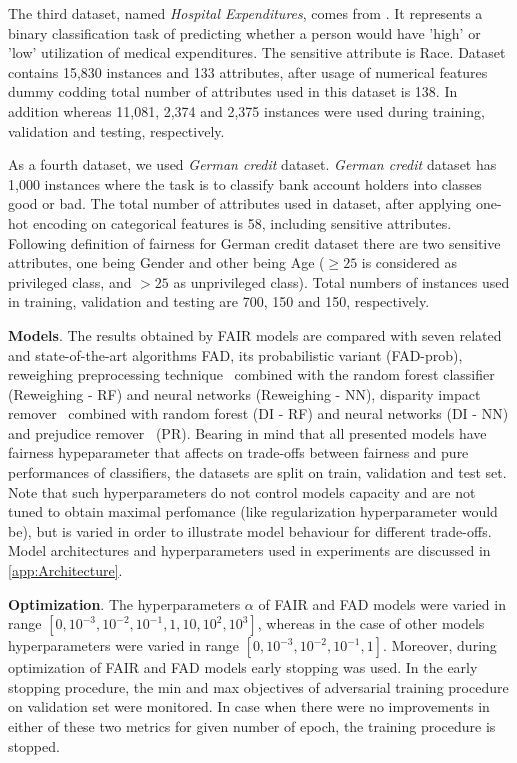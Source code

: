 \documentclass[preprint,12pt]{elsarticle}
\begin{document}
The third dataset, named \textit{Hospital Expenditures}, comes from \cite{bellamy2019ai}. It represents a binary classification task of predicting whether a person would have 'high' or 'low' utilization of medical expenditures. The sensitive attribute is Race. Dataset contains 15,830 instances and 133 attributes, after usage of numerical features dummy codding total number of attributes used in this dataset is 138. In addition whereas 11,081, 2,374 and 2,375 instances were used during training, validation and testing, respectively.

As a fourth dataset, we used \textit{German credit} dataset. \textit{German credit} dataset has 1,000 instances where the task is to classify bank account holders into classes good or bad. The total number of attributes used in dataset, after applying one-hot encoding on categorical features is 58, including sensitive attributes. Following \cite{kamiran2012decision} definition of fairness for German credit dataset there are two sensitive attributes, one being Gender and other being Age ($\geq 25$ is considered as privileged class, and $> 25$ as unprivileged class).  Total numbers of instances used in training, validation and testing are 700, 150 and 150, respectively.

\textbf{Models}. \sloppy The results obtained by FAIR models are compared with seven related and state-of-the-art algorithms FAD, its probabilistic variant (FAD-prob), reweighing preprocessing technique~\cite{kamiran2012data} combined with the random forest classifier (Reweighing - RF) and neural networks (Reweighing - NN), disparity impact remover~\cite{feldman2015certifying} combined with random forest (DI - RF) and neural networks (DI - NN) and prejudice remover~\cite{kamishima2012fairness} (PR). Bearing in mind that all presented models have fairness hypeparameter that affects on trade-offs between fairness and pure performances of classifiers, the datasets are split on train, validation and test set. Note that such hyperparameters do not control models capacity and are not tuned to obtain maximal perfomance (like regularization hyperparameter would be), but is varied in order to illustrate model behaviour for different trade-offs. Model architectures and hyperparameters used in experiments are discussed in \ref{app:Architecture}.

\textbf{Optimization}.
The hyperparameters $\alpha$ of FAIR and FAD models were varied in range $[0, 10^{-3}, 10^{-2}, 10^{-1}, 1, 10, 10^{2}, 10^{3}]$, whereas in the case of other models hyperparameters were varied in range $[0, 10^{-3}, 10^{-2}, 10^{-1}, 1]$. Moreover, during optimization of FAIR and FAD models early stopping was used. In the early stopping procedure, the min and max objectives of adversarial training procedure on validation set were monitored. In case when there were no improvements in either of these two metrics for given number of epoch, the training procedure is stopped.
\end{document}
